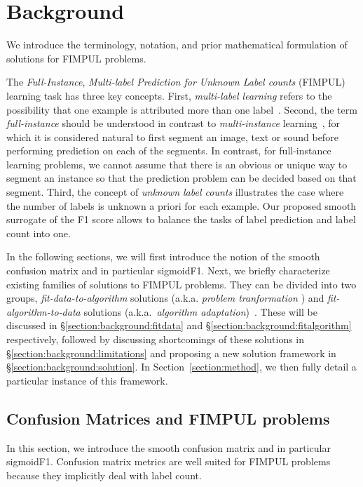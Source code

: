 \section{Background}
\label{section:background}

We introduce the terminology, notation, and prior mathematical formulation of solutions for FIMPUL problems.

The \emph{Full-Instance}, \emph{Multi-label Prediction for Unknown Label counts} (FIMPUL) learning task has three key concepts.
First, \emph{multi-label learning} refers to the possibility that one example is attributed more than one label~\cite{multilabelMethods}.
Second, the term \emph{full-instance} should be understood in contrast to \emph{multi-instance} learning~\citep[e.g.,][]{multiInstance,multiInstanceMultiLabel}, for which it is considered natural to first segment an image, text or sound before performing prediction on each of the segments. In contrast, for full-instance learning problems, we cannot assume that there is an obvious or unique way to segment an instance so that the prediction problem can be decided based on that segment.
Third, the concept of \emph{unknown label counts} illustrates the case where the number of labels is unknown a priori for each example. Our proposed smooth surrogate of the F1 score allows to balance the tasks of label prediction and label count into one.

In the following sections, we will first introduce the notion of the smooth confusion matrix and in particular sigmoidF1.
Next, we briefly characterize existing families of solutions to FIMPUL problems.
They can be divided into two groups, \emph{fit-data-to-algorithm} solutions (a.k.a. \emph{problem tranformation} ) and \emph{fit-algorithm-to-data} solutions (a.k.a.\ \emph{algorithm adaptation})~\cite{multilabelReview}. These will be discussed in \S\ref{section:background:fitdata} and \S\ref{section:background:fitalgorithm} respectively, followed by discussing shortcomings of these solutions in \S\ref{section:background:limitations} and proposing a new solution framework in \S\ref{section:background:solution}.
In Section~\ref{section:method}, we then fully detail a particular instance of this framework.

\subsection{Confusion Matrices and FIMPUL problems}
In this section, we introduce the smooth confusion matrix and in particular sigmoidF1. Confusion matrix metrics are well suited for FIMPUL problems because they implicitly deal with label count.

